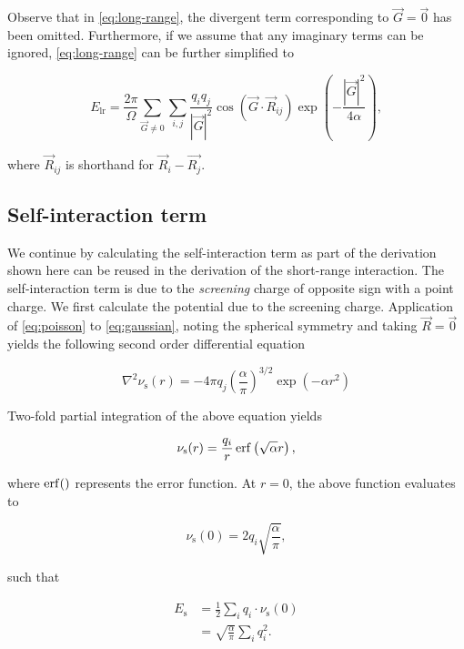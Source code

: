 Observe that in \cref{eq:long-range}, the divergent term corresponding to $\vec{G} = \vec{0}$ has been omitted. Furthermore, if we assume that any imaginary terms can be ignored, \cref{eq:long-range} can be further simplified to

\begin{equation}
    E_{\text{lr}} = \frac{2 \pi}{\Omega} \sum_{\vec{G} \neq 0} \sum_{i,j} \frac{q_{i}q_{j}}{|\vec{G}|^{2}} \cos \left(\vec{G} \cdot \vec{R}_{ij} \right) \exp \left(- \frac{|\vec{G}|^{2}}{4 \alpha} \right),
    \label{eq:long-range-cos}
\end{equation}

where $\vec{R}_{ij}$ is shorthand for $\vec{R}_{i} - \vec{R_{j}}$.

%
%
%
\subsection{Self-interaction term}

We continue by calculating the self-interaction term as part of the derivation shown here can be reused in the derivation of the short-range interaction. The self-interaction term is due to the \textit{screening} charge of opposite sign with a point charge. We first calculate the potential due to the screening charge. Application of \cref{eq:poisson} to \cref{eq:gaussian}, noting the spherical symmetry and taking $\vec{R} = \vec{0}$ yields the following second order differential equation

\begin{equation}
    \nabla^{2} \nu_{\text{s}} (r) = -4 \pi q_{j} \left( \frac{\alpha}{\pi} \right)^{3/2} \exp \left(- \alpha r^{2} \right)
\end{equation}

Two-fold partial integration of the above equation yields

\begin{equation}
    \nu_{\text{s}} (r) = \frac{q_{i}}{r} \operatorname{erf} \left( \sqrt{\alpha} r \right),
    \label{eq:gaussian_erf}
\end{equation}

where $\operatorname{erf}()$ represents the error function. At $r = 0$, the above function evaluates to

\begin{equation}
    \nu_{\text{s}} (0) = 2 q_{i} \sqrt{\frac{\alpha}{\pi}},
\end{equation}

such that

\begin{align}
    E_{\text{s}} &= \frac{1}{2} \sum_{i} q_{i} \cdot \nu_{\text{s}} (0) \\
    &= \sqrt{\frac{\alpha}{\pi}} \sum_{i} q_{i}^{2}.
    \label{eq:ewald_self}
\end{align}

